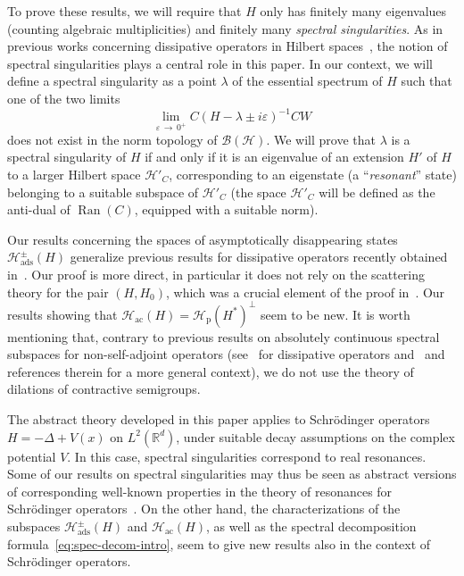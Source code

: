 \documentclass[10pt]{amsart}
\theoremstyle{definition}\newtheorem{defi}[theo]{Definition}\newtheorem{rema}[theo]{Remark}\newtheorem{exam}[theo]{Example}\newtheorem{exem}[theo]{Example}\newtheorem{nota}[theo]{Notation}
\newcommand{\Hi}{\mathcal{H}}
\newcommand{\R}{\mathbb{R}}
\newcommand{\rmp}{\mathrm{p}}
\newcommand{\acr}{\mathrm{ac}}
\newcommand{\ads}{\mathrm{ads}}
\newcommand{\clB}{\mathcal{B}}
\DeclareMathOperator{\Ran}{Ran}
\begin{document}
To prove these results, we will require that $H$ only has finitely many eigenvalues (counting algebraic multiplicities) and finitely many \emph{spectral singularities}. As in previous works concerning dissipative operators in Hilbert spaces~\cite{Fa21_01,FaFr18_01,FaNi18_01}, the notion of spectral singularities plays a central role in this paper. In our context, we will define a spectral singularity as a point $\lambda$ of the essential spectrum of $H$ such that one of the two limits
\begin{equation*}
\lim_{\varepsilon\,\to\,0^+}C(H-\lambda\pm i\varepsilon)^{-1}CW
\end{equation*}
does not exist in the norm topology of $\clB(\Hi)$. We will prove that $\lambda$ is a spectral singularity of $H$ if and only if it is an eigenvalue of an extension $H'$ of $H$ to a larger Hilbert space $\Hi'_C$, corresponding to an eigenstate (a ``\emph{resonant}'' state) belonging to a suitable subspace of $\Hi'_C$ (the space $\Hi'_C$ will be defined as the anti-dual of $\Ran(C)$, equipped with a suitable norm).

Our results concerning the spaces of asymptotically disappearing states $\Hi_{\ads}^\pm(H)$ generalize previous results for dissipative operators recently obtained in~\cite{FaFr18_01}. Our proof is more direct, in particular it does not rely on the scattering theory for the pair $(H,H_0)$, which was a crucial element of the proof in~\cite{FaFr18_01}. Our results showing that $\Hi_{\acr}(H)=\Hi_{\rmp}(H^*)^\perp$ seem to be new. It is worth mentioning that, contrary to previous results on absolutely continuous spectral subspaces for non-self-adjoint operators (see~\cite{Da80_01} for dissipative operators and~\cite{KiNa09_01,Na76_01} and references therein for a more general context), we do not use the theory of dilations of contractive semigroups.

The abstract theory developed in this paper applies to Schr\"odinger operators $H=-\Delta+V(x)$ on $L^2(\R^d)$, under suitable decay assumptions on the complex potential $V$. In this case, spectral singularities correspond to real resonances. Some of our results on spectral singularities may thus be seen as abstract versions of corresponding well-known properties in the theory of resonances for Schr\"odinger operators~\cite{DyZw19_01}. On the other hand, the characterizations of the subspaces $\Hi_{\ads}^\pm(H)$ and $\Hi_{\acr}(H)$, as well as the spectral decomposition formula~\eqref{eq:spec-decom-intro}, seem to give new results also in the context of Schr\"odinger operators.
\end{document}
